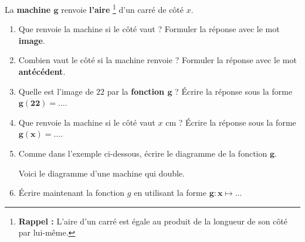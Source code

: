 \begin{exercice}
    La \textbf{machine $\boldsymbol{g}$} renvoie \textbf{l'aire} \footnote{\textbf{Rappel :} L'aire d'un carré est égale au produit de la longueur de son côté par lui-même.} d'un carré de côté $x$.
    \begin{center}
    \end{center}
    \vspace*{-5mm} 
  \begin{enumerate}
    \item Que renvoie la machine si le côté vaut   ? Formuler la réponse avec le mot \textbf{image}.
    \item Combien vaut le côté si la machine renvoie   ? Formuler la réponse avec le mot \textbf{antécédent}.
    \item Quelle est l'image de $22$ par la \textbf{fonction $\boldsymbol{g}$} ? Écrire la réponse sous la forme $\boldsymbol{g(22)=\ldots}$.
    \item Que renvoie la machine si le côté vaut $x$ cm ? Écrire la réponse sous la forme $\boldsymbol{g(x)=\ldots}$.
    \item Comme dans l'exemple ci-dessous, écrire le diagramme de la fonction $\boldsymbol{g}$.
        \begin{exemple*1}
            Voici le diagramme d'une machine qui double.
            
            \medskip
        \end{exemple*1}

        \medskip
    \item Écrire maintenant la fonction $g$ en utilisant la forme $\boldsymbol{g:x} \longmapsto \ldots$
\end{enumerate}

\end{exercice}

